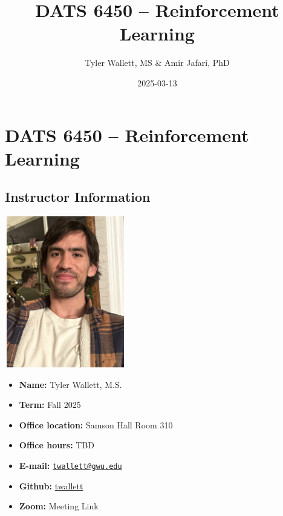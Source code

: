 \documentclass[
  letterpaper,
  DIV=11,
  numbers=noendperiod]{scrreprt}
\title{DATS 6450 -- Reinforcement Learning}
\author{Tyler Wallett, MS \& Amir Jafari, PhD}
\date{2025-03-13}
\providecommand{\tightlist}{%
  \setlength{\itemsep}{0pt}\setlength{\parskip}{0pt}}\usepackage{longtable,booktabs,array}
\renewcommand*\contentsname{Table of contents}
\newcommand\contentsname{Table of contents}
\begin{document}
\maketitle



\renewcommand*\contentsname{Table of contents}
{
\hypersetup{linkcolor=}
\setcounter{tocdepth}{2}
\tableofcontents
}


\chapter{DATS 6450 -- Reinforcement
Learning}\label{dats-6450-reinforcement-learning}

\section{Instructor Information}\label{instructor-information}

\includegraphics[width=2.08333in,height=2.60417in]{data/images/me.png}

\begin{itemize}
\tightlist
\item
  \textbf{Name:} Tyler Wallett, M.S.\\
\item
  \textbf{Term:} Fall 2025\\
\item
  \textbf{Office location:} Samson Hall Room 310\\
\item
  \textbf{Office hours:} TBD\\
\item
  \textbf{E-mail:}
  \href{mailto:twallett@gwu.edu}{\nolinkurl{twallett@gwu.edu}}\\
\item
  \textbf{Github:} \href{https://github.com/twallett}{twallett}\\
\item
  \textbf{Zoom:} Meeting Link\\
\end{itemize}
\end{document}
